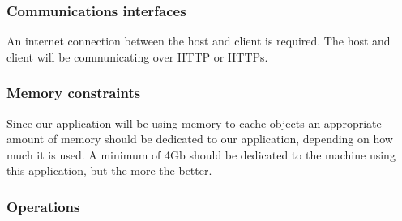 
\subsubsection{Communications interfaces}

An internet connection between the host and client is required.
The host and client will be communicating over HTTP or HTTPs.


\subsubsection{Memory constraints}

Since our application will be using memory to cache objects an appropriate amount of memory should be dedicated to our application, depending on how much it is used.
A minimum of 4Gb should be dedicated to the machine using this application, but the more the better.

\subsubsection{Operations}


